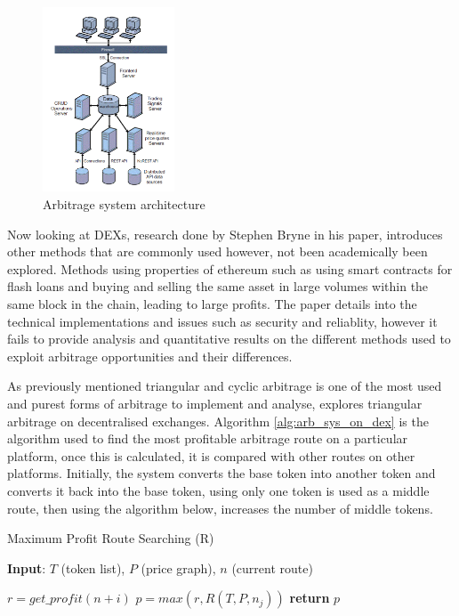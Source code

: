 \begin{figure}[!htb]
    \centering
    \includegraphics[width=0.35\textwidth]{background/Images/Arbitrage-Architecture.png}
    \caption{Arbitrage system architecture~\cite{PAUNACristian2018ATSf}}
\end{figure}

Now looking at DEXs, research done by Stephen Bryne in his paper, \cite{byrneexploration} introduces other methods that are commonly used however, not been academically been explored. Methods using properties of ethereum such as using smart contracts for flash loans and buying and selling the same asset in large volumes within the same block in the chain, leading to large profits. The paper details into the technical implementations and issues such as security and reliablity, however it fails to provide analysis and quantitative results on the different methods used to exploit arbitrage opportunities and their differences.


As previously mentioned triangular and cyclic arbitrage is one of the most used and purest forms of arbitrage to implement and analyse, \cite{boonpeam2021arbitrage} explores triangular arbitrage on decentralised exchanges. Algorithm \ref{alg:arb_sys_on_dex} is the algorithm used to find the most profitable arbitrage route on a particular platform, once this is calculated, it is compared with other routes on other platforms. Initially, the system converts the base token into another token and converts it back into the base token, using only one token is used as a middle route, then using the algorithm below, increases the number of middle tokens.

\begin{algorithm}
    \caption{Maximum Profit Route Searching (R)}\label{alg:arb_sys_on_dex}
    \textbf{Input}: $T$ (token list), $P$ (price graph), $n$ (current route)
    \begin{algorithmic}
        \State $r = get\_profit(n+i)$
            \State $p = max(r, R(T, P, n_j))$
        \EndFor
    \EndFor
    \State \textbf{return} $p$
    \end{algorithmic}
\end{algorithm}

